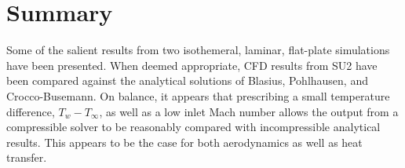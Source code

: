 \documentclass[12pt,letterpaper]{article}
\begin{document}
\section*{Summary}
Some of the salient results from two isothemeral, laminar, flat-plate simulations have been presented. When deemed appropriate, CFD results from SU2 have been compared against the analytical solutions of Blasius, Pohlhausen, and Crocco-Busemann. On balance, it appears that prescribing a small temperature difference, $T_w-T_\infty$, as well as a low inlet Mach number allows the output from a compressible solver to be reasonably compared with incompressible analytical results. This appears to be the case for both aerodynamics as well as heat transfer.
\end{document}
